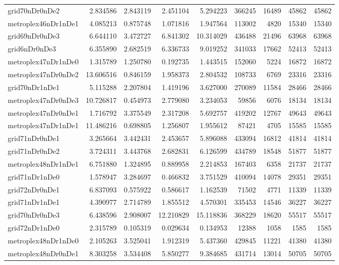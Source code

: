 \begin{longtable}{|l|r|r|r|r|r|r|r|r|}
grid70nDr0nDe2 & 2.834586 & 2.843119 & 2.451104 & 5.294223 & 366245 & 16489 & 45862 & 45862 \\
metroplex46nDr1nDe1 & 4.085213 & 0.875748 & 1.071816 & 1.947564 & 113002 & 4820 & 15340 & 15340 \\
grid69nDr0nDe3 & 6.644110 & 3.472727 & 6.841302 & 10.314029 & 436488 & 21496 & 63968 & 63968 \\
grid6nDr0nDe3 & 6.355890 & 2.682519 & 6.336733 & 9.019252 & 341033 & 17662 & 52413 & 52413 \\
metroplex47nDr1nDe0 & 1.315789 & 1.250780 & 0.192735 & 1.443515 & 152060 & 5224 & 16872 & 16872 \\
metroplex47nDr0nDe2 & 13.606516 & 0.846159 & 1.958373 & 2.804532 & 108733 & 6769 & 23316 & 23316 \\
grid70nDr1nDe1 & 5.115288 & 2.207804 & 1.419196 & 3.627000 & 270089 & 11584 & 28466 & 28466 \\
metroplex47nDr0nDe3 & 10.726817 & 0.454973 & 2.779080 & 3.234053 & 59856 & 6076 & 18134 & 18134 \\
metroplex47nDr0nDe1 & 1.716792 & 3.375549 & 2.317208 & 5.692757 & 419202 & 12767 & 49643 & 49643 \\
metroplex47nDr1nDe1 & 11.486216 & 0.698805 & 1.256807 & 1.955612 & 87421 & 4705 & 15585 & 15585 \\
grid71nDr0nDe1 & 3.265664 & 3.442431 & 2.453657 & 5.896088 & 433094 & 16812 & 41814 & 41814 \\
grid71nDr0nDe2 & 3.724311 & 3.443768 & 2.682831 & 6.126599 & 434789 & 18548 & 51877 & 51877 \\
metroplex48nDr1nDe1 & 6.751880 & 1.324895 & 0.889958 & 2.214853 & 167403 & 6358 & 21737 & 21737 \\
grid71nDr1nDe0 & 1.578947 & 3.284697 & 0.466832 & 3.751529 & 410094 & 14078 & 29351 & 29351 \\
grid72nDr0nDe1 & 6.837093 & 0.575922 & 0.586617 & 1.162539 & 71502 & 4771 & 11339 & 11339 \\
grid71nDr1nDe1 & 4.390977 & 2.714789 & 1.855512 & 4.570301 & 335453 & 14546 & 36227 & 36227 \\
grid70nDr0nDe3 & 6.438596 & 2.908007 & 12.210829 & 15.118836 & 368229 & 18620 & 55517 & 55517 \\
grid72nDr1nDe0 & 2.315789 & 0.105319 & 0.029634 & 0.134953 & 12388 & 1058 & 1585 & 1585 \\
metroplex48nDr1nDe0 & 2.105263 & 3.525041 & 1.912319 & 5.437360 & 429845 & 11221 & 41380 & 41380 \\
metroplex48nDr0nDe1 & 8.303258 & 3.534408 & 5.850277 & 9.384685 & 431714 & 13014 & 50705 & 50705 \\

\end{longtable}

